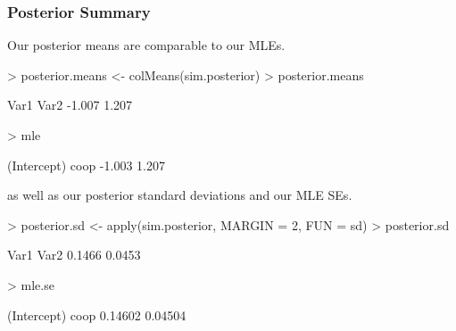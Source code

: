 \documentclass[handout]{beamer}
\begin{document}
\begin{frame}[fragile]
\frametitle{Posterior Summary}
\pause
Our posterior means are comparable to our MLEs.
\medskip
\pause
\tiny
\begin{Schunk}
\begin{Sinput}
> posterior.means <- colMeans(sim.posterior)
> posterior.means
\end{Sinput}
\begin{Soutput}
  Var1   Var2 
-1.007  1.207 
\end{Soutput}
\begin{Sinput}
> mle
\end{Sinput}
\begin{Soutput}
(Intercept)        coop 
     -1.003       1.207 
\end{Soutput}
\end{Schunk}
\normalsize
\bigskip
\pause
as well as our posterior standard deviations and our MLE SEs.
\medskip
\pause
\tiny
\begin{Schunk}
\begin{Sinput}
> posterior.sd <- apply(sim.posterior, MARGIN = 2, FUN = sd)
> posterior.sd
\end{Sinput}
\begin{Soutput}
  Var1   Var2 
0.1466 0.0453 
\end{Soutput}
\begin{Sinput}
> mle.se
\end{Sinput}
\begin{Soutput}
(Intercept)        coop 
    0.14602     0.04504 
\end{Soutput}
\end{Schunk}
\end{frame}
\end{document}
